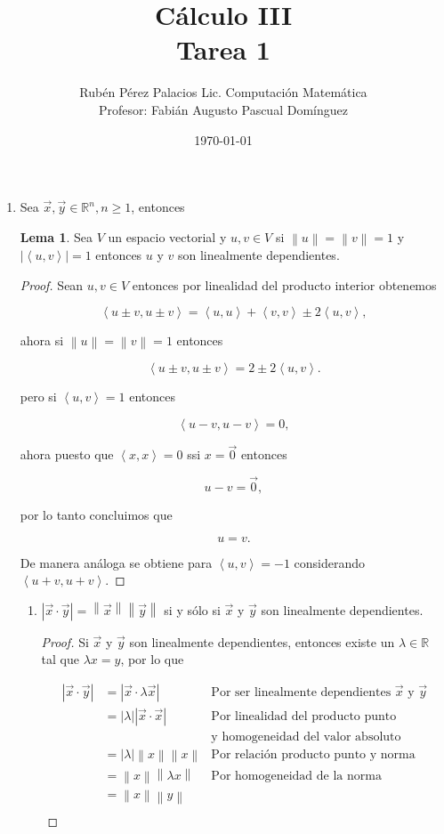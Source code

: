 \documentclass[letterpaper]{article}
\title{Cálculo III \\ Tarea 1}
\author{Rubén Pérez Palacios Lic. Computación Matemática\\Profesor: Fabián Augusto Pascual Domínguez}
\date{\today}
\theoremstyle{definition}
\theoremstyle{lemathm}
\newtheorem{lema}{Lema}
\theoremstyle{lemathm}
\theoremstyle{lemathm}
\theoremstyle{lemademthm}
\newcommand{\abs}[1]{\left| #1 \right| }
\newcommand{\inprod}[1]{\left\langle #1 \right\rangle }
\newcommand{\norm}[1]{\left\lVert#1\right\rVert}
\newcommand{\RR}{\mathbb{R}}
\newcommand{\1}{\mathbbm{1}}
\begin{document}
	\maketitle

	\begin{enumerate}
		\item Sea $\vec{x},\vec{y}\in \RR^n, n \geq 1$, entonces
		
		\begin{lema}
			Sea $V$ un espacio vectorial y $u,v \in V$ si $\norm{u} = \norm{v} = 1$ y $|\inprod{u,v}| = 1$ entonces $u$ y $v$ son linealmente dependientes.
		\end{lema}

		\begin{proof}
			Sean $u,v\in V$ entonces por linealidad del producto interior obtenemos

			\[\inprod{u\pm v,u\pm v} = \inprod{u,u}+\inprod{v,v} \pm 2\inprod{u,v},\]

			ahora si $\norm{u} = \norm{v} = 1$ entonces

			\[\inprod{u\pm v,u\pm v} = 2 \pm 2\inprod{u,v}.\]

			pero si $\inprod{u,v} = 1$ entonces

			\[\inprod{u-v,u-v} = 0,\]

			ahora puesto que $\inprod{x,x} = 0$ ssi $x=\vec{0}$ entonces

			\[u-v = \vec{0},\]

			por lo tanto concluimos que

			\[u = v.\]

			De manera análoga se obtiene para $\inprod{u,v} = -1$ considerando $\inprod{u+v,u+v}$.

		\end{proof}
		
		\begin{enumerate}
			\item $\abs{\vec{x}\cdot\vec{y}} = \norm{\vec{x}}\norm{\vec{y}}$ si y sólo si $\vec{x}$ y $\vec{y}$ son linealmente dependientes.
			
			\begin{proof}
				Si $\vec{x}$ y $\vec{y}$ son linealmente dependientes, entonces existe un $\lambda\in\RR$ tal que $\lambda x = y$, por lo que

				\begin{align*}
					\abs{\vec{x}\cdot\vec{y}} &= \abs{\vec{x}\cdot\lambda\vec{x}} &\text{Por ser linealmente dependientes $\vec{x}$ y $\vec{y}$}\\
					&= \abs{\lambda}\abs{\vec{x}\cdot\vec{x}} &\text{Por linealidad del producto punto}\\
					& &\text{y homogeneidad del valor absoluto}\\
					&= \abs{\lambda}\norm{x}\norm{x} &\text{Por relación producto punto y norma}\\
					&= \norm{x}\norm{\lambda x} &\text{Por homogeneidad de la norma}\\
					&= \norm{x}\norm{y}\\
				\end{align*}


\end{proof}
\end{enumerate}
\end{enumerate}
\end{document}
